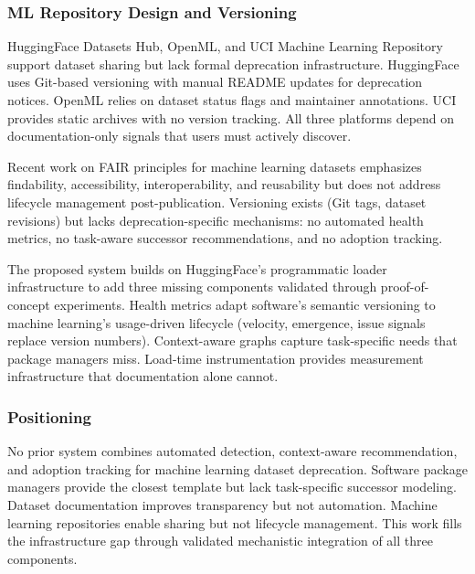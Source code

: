 \subsubsection{ML Repository Design and Versioning}

HuggingFace Datasets Hub, OpenML, and UCI Machine Learning Repository support dataset sharing but lack formal deprecation infrastructure. HuggingFace uses Git-based versioning with manual README updates for deprecation notices. OpenML relies on dataset status flags and maintainer annotations. UCI provides static archives with no version tracking. All three platforms depend on documentation-only signals that users must actively discover.

Recent work on FAIR principles for machine learning datasets emphasizes findability, accessibility, interoperability, and reusability but does not address lifecycle management post-publication. Versioning exists (Git tags, dataset revisions) but lacks deprecation-specific mechanisms: no automated health metrics, no task-aware successor recommendations, and no adoption tracking.

The proposed system builds on HuggingFace's programmatic loader infrastructure to add three missing components validated through proof-of-concept experiments. Health metrics adapt software's semantic versioning to machine learning's usage-driven lifecycle (velocity, emergence, issue signals replace version numbers). Context-aware graphs capture task-specific needs that package managers miss. Load-time instrumentation provides measurement infrastructure that documentation alone cannot.

\subsubsection{Positioning}

No prior system combines automated detection, context-aware recommendation, and adoption tracking for machine learning dataset deprecation. Software package managers provide the closest template but lack task-specific successor modeling. Dataset documentation improves transparency but not automation. Machine learning repositories enable sharing but not lifecycle management. This work fills the infrastructure gap through validated mechanistic integration of all three components.
